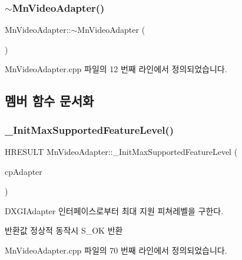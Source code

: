 \subsubsection{\texorpdfstring{$\sim$\+Mn\+Video\+Adapter()}{~MnVideoAdapter()}}
{\footnotesize\ttfamily Mn\+Video\+Adapter\+::$\sim$\+Mn\+Video\+Adapter (\begin{DoxyParamCaption}{ }\end{DoxyParamCaption})}



Mn\+Video\+Adapter.\+cpp 파일의 12 번째 라인에서 정의되었습니다.



\subsection{멤버 함수 문서화}
\mbox{\label{class_m_n_l_1_1_mn_video_adapter_a1b7d80620cd499d72a737b11619ec8e1}} 
\subsubsection{\texorpdfstring{\+\_\+\+Init\+Max\+Supported\+Feature\+Level()}{\_InitMaxSupportedFeatureLevel()}}
{\footnotesize\ttfamily H\+R\+E\+S\+U\+LT Mn\+Video\+Adapter\+::\+\_\+\+Init\+Max\+Supported\+Feature\+Level (\begin{DoxyParamCaption}\item[{\hyperlink{namespace_m_n_l_ab0e24805043a50c45364c389f8929f33}{C\+P\+D\+X\+G\+I\+Adapter}}]{cp\+Adapter }\end{DoxyParamCaption})\hspace{0.3cm}{\ttfamily [private]}}



D\+X\+G\+I\+Adapter 인터페이스로부터 최대 지원 피쳐레벨을 구한다. 

\begin{DoxyReturn}{반환값}
정상적 동작시 S\+\_\+\+OK 반환 
\end{DoxyReturn}


Mn\+Video\+Adapter.\+cpp 파일의 70 번째 라인에서 정의되었습니다.

\mbox{\label{class_m_n_l_1_1_mn_video_adapter_a43a6fc9c2bafd81b77718b0ea8bf6885}} 
